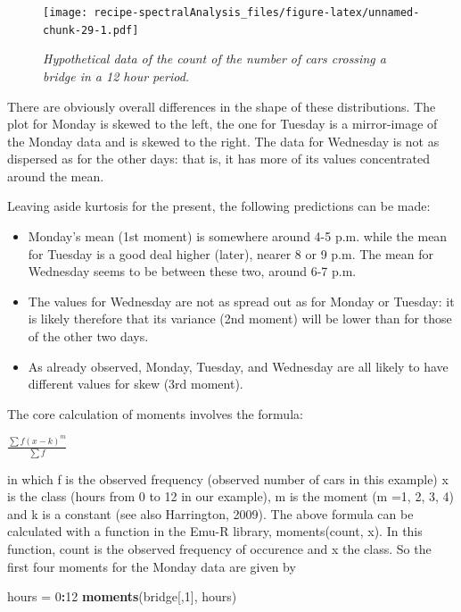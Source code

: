 \documentclass[]{book}
\newenvironment{Shaded}{\begin{snugshade}}{\end{snugshade}}
\newcommand{\DecValTok}[1]{\textcolor[rgb]{0.00,0.00,0.81}{#1}}
\newcommand{\KeywordTok}[1]{\textcolor[rgb]{0.13,0.29,0.53}{\textbf{#1}}}
\newcommand{\NormalTok}[1]{#1}
\newcommand{\OperatorTok}[1]{\textcolor[rgb]{0.81,0.36,0.00}{\textbf{#1}}}
\newcommand{\StringTok}[1]{\textcolor[rgb]{0.31,0.60,0.02}{#1}}
\begin{document}
\begin{figure}
\centering
\texttt{[image: recipe-spectralAnalysis\_files/figure-latex/unnamed-chunk-29-1.pdf]}
\caption{\label{fig:unnamed-chunk-29}\emph{Hypothetical data of the count of the number of cars crossing a bridge in a 12 hour period.}}
\end{figure}

There are obviously overall differences in the shape of these distributions. The
plot for Monday is skewed to the left, the one for Tuesday is a mirror-image of
the Monday data and is skewed to the right. The data for Wednesday is not as
dispersed as for the other days: that is, it has more of its values concentrated
around the mean.

Leaving aside kurtosis for the present, the following predictions can be made:

\begin{itemize}
\item
  Monday's mean (1st moment) is somewhere around 4-5 p.m. while the mean for
  Tuesday is a good deal higher (later), nearer 8 or 9 p.m. The mean for Wednesday
  seems to be between these two, around 6-7 p.m.
\item
  The values for Wednesday are not as spread out as for Monday or Tuesday: it is
  likely therefore that its variance (2nd moment) will be lower than for those of
  the other two days.
\item
  As already observed, Monday, Tuesday, and Wednesday are all likely to have
  different values for skew (3rd moment).
\end{itemize}

The core calculation of moments involves the formula:

\(\frac{\sum{f(x-k)^m}}{\sum{f}}\)

in which f is the observed frequency (observed number of cars in this example) x is the class (hours from 0 to 12 in our example), m is the moment (m =1, 2, 3, 4) and k is a constant (see also Harrington, 2009). The above formula can be calculated with a function in the Emu-R library, moments(count, x). In this function, count is the observed frequency of occurence and x the class. So the first four moments for the Monday data are given by

\begin{Shaded}
\begin{Highlighting}[]
\NormalTok{hours =}\StringTok{ }\DecValTok{0}\OperatorTok{:}\DecValTok{12}
\KeywordTok{moments}\NormalTok{(bridge[,}\DecValTok{1}\NormalTok{], hours)}
\end{Highlighting}
\end{Shaded}
\end{document}
